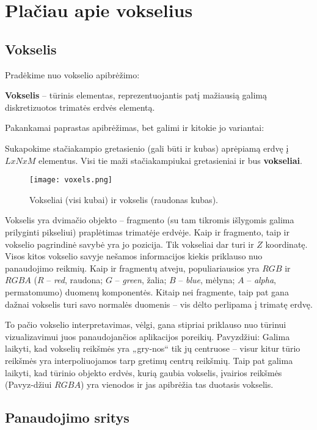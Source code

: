 \section{Plačiau apie vokselius}

\subsection{Vokselis}

Pradėkime nuo vokselio apibrėžimo:

{\bf Vokselis} -- tūrinis elementas, reprezentuojantis patį mažiausią galimą
diskretizuotos trimatės erdvės elementą.

Pakankamai paprastas apibrėžimas, bet galimi ir kitokie jo variantai:

Sukapokime stačiakampio gretasienio (gali būti ir kubas) aprėpiamą erdvę į
$LxNxM$ elementus. Visi tie maži stačiakampiukai gretasieniai ir bus
{\bf vokseliai}.

\begin{figure}
\centering
\texttt{[image: voxels.png]}
\caption{Vokseliai (visi kubai) ir vokselis (raudonas kubas).}
\label{fig:voxels}
\end{figure}

Vokselis yra dvimačio objekto -- fragmento (su tam tikromis išlygomis galima
prilyginti pikseliui) praplėtimas trimatėje erdvėje. Kaip ir fragmento, taip
ir vokselio pagrindinė savybė yra jo pozicija. Tik vokseliai dar turi ir $Z$
koordinatę. Visos kitos vokselio savyje nešamos informacijos kiekis priklauso
nuo panaudojimo reikmių. Kaip ir fragmentų atveju, populiariausios yra $RGB$
ir $RGBA$ ($R$ -- \emph{red}, raudona; $G$ -- \emph{green}, žalia; $B$ --
\emph{blue}, mėlyna; $A$ -- \emph{alpha}, permatomumo) duomenų komponentės.
Kitaip nei fragmente, taip pat gana dažnai vokselis turi savo normalės
duomenis -- vis dėlto perlipama į trimatę erdvę.

To pačio vokselio interpretavimas, vėlgi, gana stipriai priklauso nuo tūrinui
vizualizavimui juos panaudojančios aplikacijos poreikių. Pavyzdžiui: Galima
laikyti, kad vokselių reikšmės yra „gry-nos“ tik jų centruose -- visur kitur
tūrio reikšmės yra interpoliuojamos tarp gretimų centrų reikšmių. Taip pat
galima laikyti, kad tūrinio objekto erdvės, kurią gaubia vokselis, įvairios
reikšmės (Pavyz-džiui $RGBA$) yra vienodos ir jas apibrėžia tas duotasis
vokselis.

\subsection{Panaudojimo sritys}

